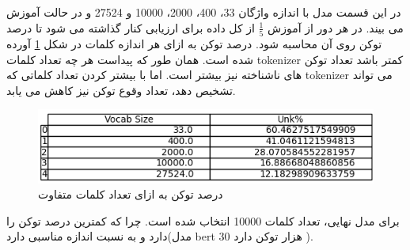 \section{}
در این قسمت مدل
با اندازه واژگان
33،
 400،
  2000،
   10000 
و
 27524
و در حالت 
آموزش می بیند. در هر دور از آموزش $\frac{1}{5}$ از کل داده برای ارزیابی کنار گذاشته می شود تا درصد توکن
روی آن محاسبه شود. درصد توکن 
به ازای هر اندازه کلمات در شکل
\ref{fig21}
آورده شده است. همان طور که پیداست هر چه تعداد کلمات
tokenizer
کمتر باشد تعداد توکن های ناشناخته نیز بیشتر است. اما با بیشتر کردن تعداد کلماتی که 
tokenizer
می تواند تشخیص دهد، تعداد وقوع توکن
نیز کاهش می یابد.


 \begin{figure}[H]
	\centering
	
	\includegraphics[width=1\textwidth,height=1\textheight,keepaspectratio]{../reports/tokenization/unk_percent}
	\caption{درصد توکن 
		به ازای تعداد کلمات متفاوت}
	\label{fig21}
	
\end{figure}

برای مدل نهایی، تعداد کلمات 10000 انتخاب شده است. چرا که کمترین درصد توکن
را دارد و به نسبت اندازه مناسبی دارد(مدل bert 
30 هزار توکن دارد \cite{Ref4}).